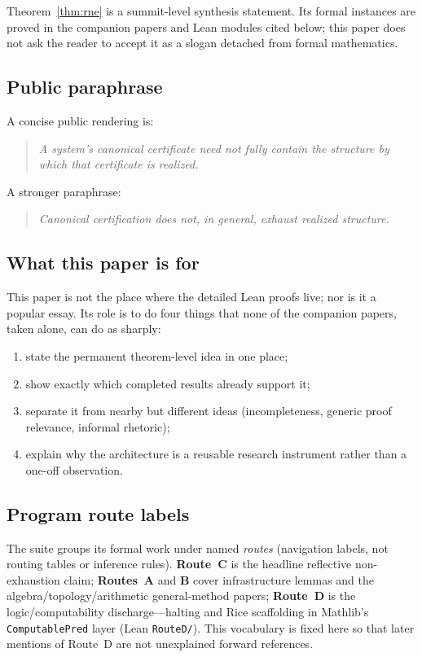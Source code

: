 \documentclass[11pt]{article}
\begin{document}
\noindent
Theorem~\ref{thm:rne} is a summit-level synthesis statement. Its formal instances are
proved in the companion papers and Lean modules cited below; this paper does not ask
the reader to accept it as a slogan detached from formal mathematics.

\subsection{Public paraphrase}

A concise public rendering is:

\begin{quote}
\emph{A system's canonical certificate need not fully contain the structure by
which that certificate is realized.}
\end{quote}

A stronger paraphrase:

\begin{quote}
\emph{Canonical certification does not, in general, exhaust realized structure.}
\end{quote}

\subsection{What this paper is for}

This paper is not the place where the detailed Lean proofs live; nor is it a
popular essay. Its role is to do four things that none of the companion papers,
taken alone, can do as sharply:

\begin{enumerate}[label=(\arabic*)]
  \item state the permanent theorem-level idea in one place;
  \item show exactly which completed results already support it;
  \item separate it from nearby but different ideas (incompleteness, generic proof
    relevance, informal rhetoric);
  \item explain why the architecture is a reusable research instrument rather than
    a one-off observation.
\end{enumerate}

\subsection{Program route labels}\label{sec:route-labels}

The suite groups its formal work under named \emph{routes} (navigation labels, not
routing tables or inference rules). \textbf{Route~C} is the headline reflective
non-exhaustion claim; \textbf{Routes~A} and \textbf{B} cover infrastructure lemmas
and the algebra/topology/arithmetic general-method papers; \textbf{Route~D} is the
logic/computability discharge---halting and Rice scaffolding in Mathlib's
\texttt{ComputablePred} layer (Lean \texttt{RouteD/}). This vocabulary is fixed here
so that later mentions of Route~D are not unexplained forward references.
\end{document}

